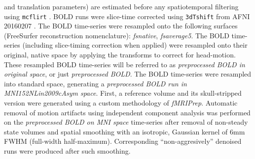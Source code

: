 \begin{description}
and translation parameters) are estimated before any spatiotemporal
filtering using \texttt{mcflirt} \citep[FSL 5.0.9,][]{mcflirt}. BOLD
runs were slice-time corrected using \texttt{3dTshift} from AFNI
20160207 \citep[RRID:SCR\_005927]{afni}. The BOLD time-series were
resampled onto the following surfaces (FreeSurfer reconstruction
nomenclature): \emph{fsnative}, \emph{fsaverage5}. The BOLD time-series
(including slice-timing correction when applied) were resampled onto
their original, native space by applying the transforms to correct for
head-motion. These resampled BOLD time-series will be referred to as
\emph{preprocessed BOLD in original space}, or just \emph{preprocessed
BOLD}. The BOLD time-series were resampled into standard space,
generating a \emph{preprocessed BOLD run in MNI152NLin2009cAsym space}.
First, a reference volume and its skull-stripped version were generated
using a custom methodology of \emph{fMRIPrep}. Automatic removal of
motion artifacts using independent component analysis
\citep[ICA-AROMA,][]{aroma} was performed on the \emph{preprocessed BOLD
on MNI space} time-series after removal of non-steady state volumes and
spatial smoothing with an isotropic, Gaussian kernel of 6mm FWHM
(full-width half-maximum). Corresponding ``non-aggresively'' denoised
runs were produced after such smoothing.

\end{description}
